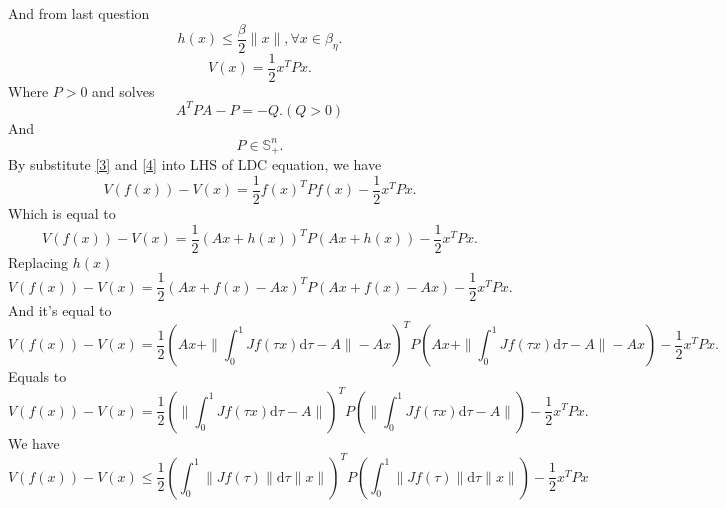 \documentclass[a4paper,11pt,reqno]{amsart}
\newcommand{\dd}{\mathrm{d}}
\newcommand{\smallplus}{{\scriptscriptstyle +}}
\newcommand{\Sp}{\mathbb{S}_{\smallplus}}
\begin{document}
\begin{enumerate}
\begin{equation}
            \end{equation}
        And from last question
            \begin{equation}
                h(x) \leq \frac{\beta}{2} \|x\|, \forall x \in \beta_\eta.
            \end{equation}
            \begin{equation}
                \label{4}
                V(x) = \frac{1}{2} x^T P x.
            \end{equation}
        Where $P>0$ and solves
            \begin{equation}
                \label{5}
                A^T P A - P = -Q. (Q>0)
            \end{equation}
        And
            \begin{equation}
                P \in \Sp^n.
            \end{equation}
        By substitute \eqref{3} and \eqref{4} into LHS of LDC equation, we have
            \begin{equation}
                V(f(x)) - V(x) = \frac{1}{2}f(x)^TPf(x) - \frac{1}{2}x^TPx.
            \end{equation}
        Which is equal to
            \begin{equation}
                V(f(x)) - V(x) = \frac{1}{2}(Ax + h(x))^TP(Ax + h(x)) - \frac{1}{2}x^TPx.
            \end{equation}
        Replacing $h(x)$ 
            \begin{equation}
                V(f(x)) - V(x) = \frac{1}{2}(Ax + f(x)-Ax)^TP(Ax + f(x)-Ax) - \frac{1}{2}x^TPx.
            \end{equation}
        And it's equal to 
            \begin{equation}
                V(f(x)) - V(x) = \frac{1}{2}(Ax + \|\int_0^1 Jf(\tau x)\dd\tau-A\|-Ax)^TP(Ax + \|\int_0^1 Jf(\tau x)\dd\tau-A\|-Ax) - \frac{1}{2}x^TPx.
            \end{equation}
        Equals to
            \begin{equation}
                V(f(x)) - V(x) = \frac{1}{2}(\|\int_0^1 Jf(\tau x)\dd\tau-A\|)^TP(\|\int_0^1 Jf(\tau x)\dd\tau-A\|) - \frac{1}{2}x^TPx.
            \end{equation}
        We have
            \begin{equation}
                V(f(x)) - V(x) \leq \frac{1}{2}(\int_0^1 \|Jf(\tau)\|\dd\tau \|x\|)^TP(\int_0^1 \|Jf(\tau)\|\dd\tau\|x\|) - \frac{1}{2}x^TPx
            \end{equation}

\end{enumerate}
\end{document}
